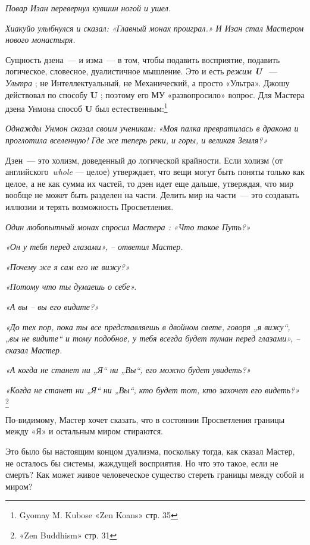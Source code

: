 \documentclass[../main.tex]{subfiles}
\begin{document}
\emph{Повар Изан перевернул кувшин ногой и ушел.}

\emph{Хиакуйо улыбнулся и сказал: «Главный монах проиграл.» И Изан стал Мастером нового монастыря.}

Сущность дзена~--- и изма~--- в том, чтобы подавить восприятие, подавить логическое, словесное, дуалистичное мышление. Это и есть \emph{режим \textbf{U}} ~--- \emph{Ультра} ; не Интеллектуальный, не Механический, а просто «Ультра». Джошу действовал по способу \textbf{U} ; поэтому его МУ «развопросило» вопрос. Для Мастера дзена Унмона способ \textbf{U} был естественным:\footnote{Gyomay M. Kubose «Zen Koans» стр. 35}

\emph{Однажды Унмон сказал своим ученикам: «Моя палка превратилась в дракона и проглотила вселенную! Где же теперь реки, и горы, и великая Земля?»}

Дзен~--- это холизм, доведенный до логической крайности. Если холизм (от английского~\emph{whole} --- целое) утверждает, что вещи могут быть поняты только как целое, а не как сумма их частей, то дзен идет еще дальше, утверждая, что мир вообще не может быть разделен на части. Делить мир на части~--- это создавать иллюзии и терять возможность Просветления.

\emph{Один любопытный монах спросил Мастера : «Что такое Путь?»}

\emph{«Он у тебя перед глазами», \--- ответил Мастер.}

\emph{«Почему же я сам его не вижу?»}

\emph{«Потому что ты думаешь о себе».}

\emph{«А вы \--- вы его видите?»}

\emph{«До тех пор, пока ты все представляешь в двойном свете, говоря „я вижу``, „вы не видите`` и тому подобное, у тебя всегда будет туман перед глазами», \--- сказал Мастер.}

\emph{«А когда не станет ни „Я`` ни „Вы``, его можно будет увидеть?»}

\emph{«Когда не станет ни „Я`` ни „Вы``, кто будет тот, кто захочет его видеть?»} \footnote{«Zen Buddhism» стр. 31}

По-видимому, Мастер хочет сказать, что в состоянии Просветления границы между «Я» и остальным миром стираются.

Это было бы настоящим концом дуализма, поскольку тогда, как сказал Мастер, не осталось бы системы, жаждущей восприятия. Но что это такое, если не смерть? Как может живое человеческое существо стереть границы между собой и миром?
\end{document}
